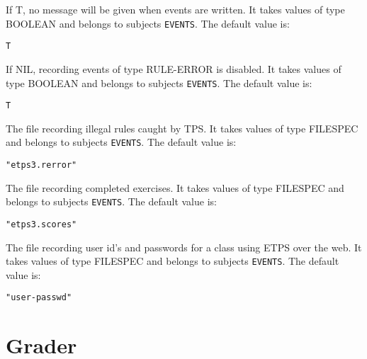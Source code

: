 \begin{description}
\item[QUIET-EVENTS]  
If T, no message will be given when events are written.
It takes values of type BOOLEAN and belongs to subjects \texttt{EVENTS}.  The default value is: \begin{lstlisting}
T
\end{lstlisting}

\item[RULE-ERROR-ENABLED]  
If NIL, recording events of type RULE-ERROR is disabled.
It takes values of type BOOLEAN and belongs to subjects \texttt{EVENTS}.  The default value is: \begin{lstlisting}
T
\end{lstlisting}

\item[RULE-ERROR-FILE]  
The file recording illegal rules caught by TPS.
It takes values of type FILESPEC and belongs to subjects \texttt{EVENTS}.  The default value is: \begin{lstlisting}
"etps3.rerror"
\end{lstlisting}

\item[SCORE-FILE]  
The file recording completed exercises.
It takes values of type FILESPEC and belongs to subjects \texttt{EVENTS}.  The default value is: \begin{lstlisting}
"etps3.scores"
\end{lstlisting}

\item[USER-PASSWD-FILE]  
The file recording user id's and passwords for a class
using ETPS over the web.
It takes values of type FILESPEC and belongs to subjects \texttt{EVENTS}.  The default value is: \begin{lstlisting}
"user-passwd"
\end{lstlisting}

\item
\end{description}

\section{Grader}

